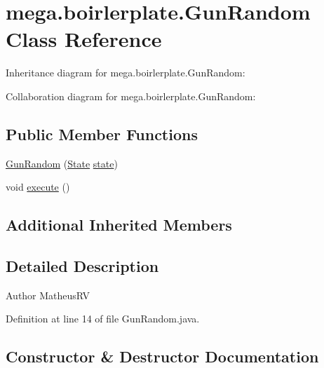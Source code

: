 \hypertarget{classmega_1_1boirlerplate_1_1_gun_random}{}\section{mega.\+boirlerplate.\+Gun\+Random Class Reference}
\label{classmega_1_1boirlerplate_1_1_gun_random}


Inheritance diagram for mega.\+boirlerplate.\+Gun\+Random\+:


Collaboration diagram for mega.\+boirlerplate.\+Gun\+Random\+:
\subsection*{Public Member Functions}
\begin{DoxyCompactItemize}
\item 
\hyperlink{classmega_1_1boirlerplate_1_1_gun_random_ae2f5ec8902b1112acb4d756750580ef2}{Gun\+Random} (\hyperlink{classmega_1_1boirlerplate_1_1_state}{State} \hyperlink{classmega_1_1boirlerplate_1_1_component_a87b0d70f323b5fee60a200e07c9c20fd}{state})
\item 
void \hyperlink{classmega_1_1boirlerplate_1_1_gun_random_a05e61f1fb87a48a1c2590fe1f8086540}{execute} ()
\end{DoxyCompactItemize}
\subsection*{Additional Inherited Members}


\subsection{Detailed Description}
\begin{DoxyAuthor}{Author}
Matheus\+RV 
\end{DoxyAuthor}


Definition at line 14 of file Gun\+Random.\+java.



\subsection{Constructor \& Destructor Documentation}
\mbox{\label{classmega_1_1boirlerplate_1_1_gun_random_ae2f5ec8902b1112acb4d756750580ef2}} 

